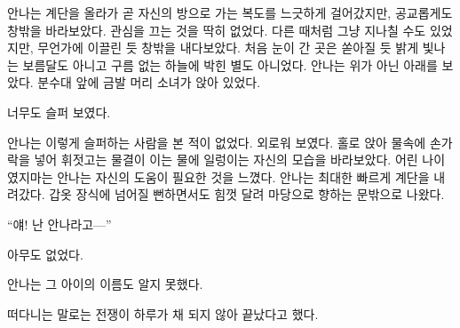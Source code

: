 안나는 계단을 올라가 곧 자신의 방으로 가는 복도를 느긋하게 걸어갔지만, 공교롭게도 창밖을 바라보았다. 관심을 끄는 것을 딱히 없었다. 다른 때처럼 그냥 지나칠 수도 있었지만, 무언가에 이끌린 듯 창밖을 내다보았다. 처음 눈이 간 곳은 쏟아질 듯 밝게 빛나는 보름달도 아니고 구름 없는 하늘에 박힌 별도 아니었다. 안나는 위가 아닌 아래를 보았다. 분수대 앞에 금발 머리 소녀가 앉아 있었다.

너무도 슬퍼 보였다.

안나는 이렇게 슬퍼하는 사람을 본 적이 없었다. 외로워 보였다. 홀로 앉아 물속에 손가락을 넣어 휘젓고는 물결이 이는 물에 일렁이는 자신의 모습을 바라보았다. 어린 나이였지마는 안나는 자신의 도움이 필요한 것을 느꼈다. 안나는 최대한 빠르게 계단을 내려갔다. 갑옷 장식에 넘어질 뻔하면서도 힘껏 달려 마당으로 향하는 문밖으로 나왔다.

``얘! 난 안나라고—''

아무도 없었다.

안나는 그 아이의 이름도 알지 못했다.

\textbreak

떠다니는 말로는 전쟁이 하루가 채 되지 않아 끝났다고 했다.

